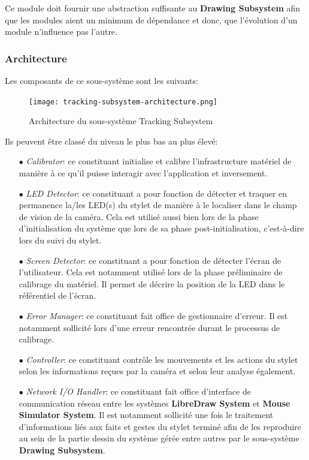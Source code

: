 \documentclass[11pt,a4paper,oldfontcommands]{memoir}
\begin{document}
Ce module doit fournir une abstraction suffisante au \textbf{Drawing Subsystem} afin que les modules aient un minimum de dépendance et donc, que l'évolution d'un module n'influence pas l'autre.

\subsubsection{Architecture}

Les composants de ce sous-système sont les suivants:

\begin{figure}[H]
\centering
\texttt{[image: tracking-subsystem-architecture.png]}
\caption{Architecture du sous-système Tracking Subsystem}
\end{figure}

Ils peuvent être classé du niveau le plus bas au plus élevé:

\begin{itemize}
\item[$\bullet$] \textit{Calibrator}: ce constituant initialise et calibre l'infrastructure matériel de manière à ce qu'il puisse interagir avec l'application et inversement.
\item[$\bullet$] \textit{LED Detector}: ce constituant a pour fonction de détecter et traquer en permanence la/les LED(s) du stylet de manière à le localiser dans le champ de vision de la caméra. Cela est utilisé aussi bien lors de la phase d'initialisation du système que lors de sa phase post-initialisation, c'est-à-dire lors du suivi du stylet.
\item[$\bullet$] \textit{Screen Detector}: ce constituant a pour fonction de détecter l'écran de l'utilisateur. Cela est notamment utilisé lors de la phase préliminaire de calibrage du matériel. Il permet de décrire la position de la LED dans le référentiel de l'écran.
\item[$\bullet$] \textit{Error Manager}: ce constituant fait office de gestionnaire d'erreur. Il est notamment sollicité lors d'une erreur rencontrée durant le processus de calibrage.
\item[$\bullet$] \textit{Controller}: ce constituant contrôle les mouvements et les actions du stylet selon les informations reçues par la caméra et selon leur analyse également.
\item[$\bullet$] \textit{Network I/O Handler}: ce constituant fait office d'interface de communication réseau entre les systèmes \textbf{LibreDraw System} et \textbf{Mouse Simulator System}. Il est notamment sollicité une fois le traitement d'informations liés aux faits et gestes du stylet terminé afin de les reproduire au sein de la partie dessin du système gérée entre autres par le sous-système \textbf{Drawing Subsystem}.
\end{itemize}
\end{document}
